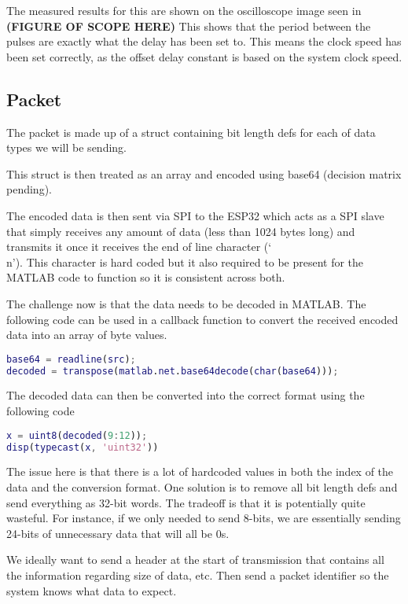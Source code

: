 The measured results for this are shown on the oscilloscope image seen in \textbf{(FIGURE OF SCOPE HERE)}
This shows that the period between the pulses are exactly what the delay has been set to.
This means the clock speed has been set correctly, as the offset delay constant is based on the system clock speed.

\subsection{Packet}
%
The packet is made up of a struct containing bit length defs
for each of data types we will be sending.

This struct is then treated as an array and encoded using base64
(decision matrix pending).

The encoded data is then sent via SPI to the ESP32 which acts
as a SPI slave that simply receives any amount of data
(less than 1024 bytes long) and transmits it once it receives
the end of line character (`\\n').
This character is hard coded but it also required to be present
for the MATLAB code to function so it is consistent across both.

The challenge now is that the data needs to be decoded in MATLAB.
The following code can be used in a callback function to convert
the received encoded data into an array of byte values.

\begin{lstlisting}[language=MATLAB]
base64 = readline(src);
decoded = transpose(matlab.net.base64decode(char(base64)));
\end{lstlisting}

The decoded data can then be converted into the correct format
using the following code

\begin{lstlisting}[language=MATLAB]
x = uint8(decoded(9:12));
disp(typecast(x, 'uint32'))
\end{lstlisting}

The issue here is that there is a lot of hardcoded values
in both the index of the data and the conversion format.
One solution is to remove all bit length defs and send everything
as 32-bit words. The tradeoff is that it is potentially quite wasteful.
For instance, if we only needed to send 8-bits, we are essentially
sending 24-bits of unnecessary data that will all be 0s.

We ideally want to send a header at the start of transmission that
contains all the information regarding size of data, etc.
Then send a packet identifier so the system knows what data to expect.

